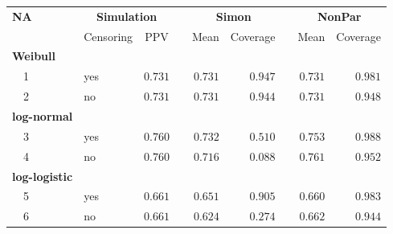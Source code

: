 \begin{table}[!tbp]
\begin{center}
\begin{tabular}{llrcrrcrr}
\hline\hline
\multicolumn{1}{l}{\bfseries NA}&\multicolumn{2}{c}{\bfseries Simulation}&\multicolumn{1}{c}{\bfseries }&\multicolumn{2}{c}{\bfseries Simon}&\multicolumn{1}{c}{\bfseries }&\multicolumn{2}{c}{\bfseries NonPar}\tabularnewline
\cline{2-3} \cline{5-6} \cline{8-9}
\multicolumn{1}{l}{}&\multicolumn{1}{c}{Censoring}&\multicolumn{1}{c}{PPV}&\multicolumn{1}{c}{}&\multicolumn{1}{c}{Mean}&\multicolumn{1}{c}{Coverage}&\multicolumn{1}{c}{}&\multicolumn{1}{c}{Mean}&\multicolumn{1}{c}{Coverage}\tabularnewline
\hline
{\bfseries Weibull}&&&&&&&&\tabularnewline
~~1&yes&$0.731$&&$0.731$&$0.947$&&$0.731$&$0.981$\tabularnewline
~~2&no&$0.731$&&$0.731$&$0.944$&&$0.731$&$0.948$\tabularnewline
\hline
{\bfseries log-normal}&&&&&&&&\tabularnewline
~~3&yes&$0.760$&&$0.732$&$0.510$&&$0.753$&$0.988$\tabularnewline
~~4&no&$0.760$&&$0.716$&$0.088$&&$0.761$&$0.952$\tabularnewline
\hline
{\bfseries log-logistic}&&&&&&&&\tabularnewline
~~5&yes&$0.661$&&$0.651$&$0.905$&&$0.660$&$0.983$\tabularnewline
~~6&no&$0.661$&&$0.624$&$0.274$&&$0.662$&$0.944$\tabularnewline
\hline
\end{tabular}\end{center}
\end{table}
